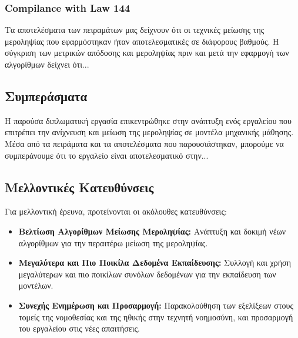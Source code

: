 \documentclass[12pt,twoside]{article}
\newcommand{\en}{\selectlanguage{english}}
\newcommand{\gr}{\selectlanguage{greek}}
\begin{document}
\subsubsection{Compilance with Law 144}
Τα αποτελέσματα των πειραμάτων μας δείχνουν ότι οι τεχνικές μείωσης της μεροληψίας που εφαρμόστηκαν ήταν αποτελεσματικές σε διάφορους βαθμούς. Η σύγκριση των μετρικών απόδοσης και μεροληψίας πριν και μετά την εφαρμογή των αλγορίθμων δείχνει ότι...

\subsection{Συμπεράσματα}
Η παρούσα διπλωματική εργασία επικεντρώθηκε στην ανάπτυξη ενός εργαλείου που επιτρέπει την ανίχνευση και μείωση της μεροληψίας σε μοντέλα μηχανικής μάθησης. Μέσα από τα πειράματα και τα αποτελέσματα που παρουσιάστηκαν, μπορούμε να συμπεράνουμε ότι το εργαλείο είναι αποτελεσματικό στην...

\subsection{Μελλοντικές Κατευθύνσεις}
Για μελλοντική έρευνα, προτείνονται οι ακόλουθες κατευθύνσεις:

\begin{itemize}
    \item \textbf{Βελτίωση Αλγορίθμων Μείωσης Μεροληψίας:} Ανάπτυξη και δοκιμή νέων αλγορίθμων για την περαιτέρω μείωση της μεροληψίας.
    \item \textbf{Μεγαλύτερα και Πιο Ποικίλα Δεδομένα Εκπαίδευσης:} Συλλογή και χρήση μεγαλύτερων και πιο ποικίλων συνόλων δεδομένων για την εκπαίδευση των μοντέλων.
    \item \textbf{Συνεχής Ενημέρωση και Προσαρμογή:} Παρακολούθηση των εξελίξεων στους τομείς της νομοθεσίας και της ηθικής στην τεχνητή νοημοσύνη, και προσαρμογή του εργαλείου στις νέες απαιτήσεις.
\end{itemize}

\newpage
\gr
\en
\thispagestyle{plain}
\renewcommand{\bibname}{\gr Βιβλιογραφία}

\end{document}
